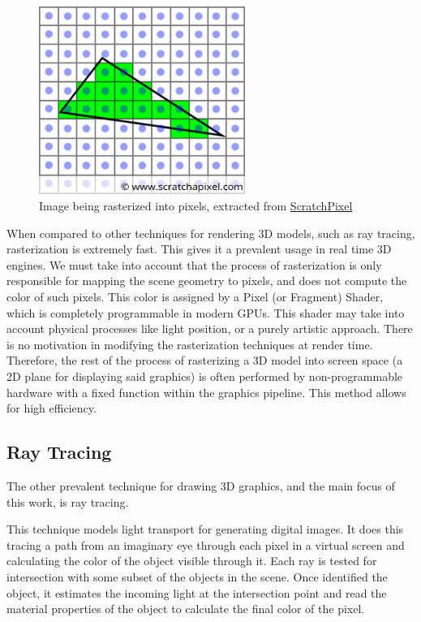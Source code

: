 \begin{figure}[hbt!]
    \centering
    \includegraphics[width=0.6\textwidth]{figuras/rasterization-triangle1.png}
    \caption{Image being rasterized into pixels, extracted from \href{https://www.scratchapixel.com/lessons/3d-basic-rendering/rasterization-practical-implementation/rasterization-stage}{ScratchPixel}}
    \label{rasterization-triangle-image}
\end{figure}
When compared to other techniques for rendering 3D models, such as ray tracing, rasterization is extremely fast. This gives it a prevalent usage in real time 3D engines. We must take into account that the process of rasterization is only responsible for mapping the scene geometry to pixels, and does not compute the color of such pixels. This color is assigned by a Pixel (or Fragment) Shader, which is completely programmable in modern GPUs. This shader may take into account physical processes like light position, or a purely artistic approach. There is no motivation in modifying the rasterization techniques at render time. Therefore, the rest of the process of rasterizing a 3D model into screen space (a 2D plane for displaying said graphics) is often performed by non-programmable hardware with a fixed function within the graphics pipeline. This method allows for high efficiency.

\subsection{Ray Tracing}
The other prevalent technique for drawing 3D graphics, and the main focus of this work, is ray tracing.

This technique models light transport for generating digital images. It does this tracing a path from an imaginary eye through each pixel in a virtual screen and calculating the color of the object visible through it. Each ray is tested for intersection with some subset of the objects in the scene. Once identified the object, it estimates the incoming light at the intersection point and read the material properties of the object to calculate the final color of the pixel.

